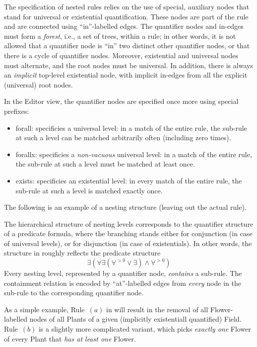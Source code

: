 The specification of nested rules relies on the use of special, auxiliary nodes
that stand for universal or existential quantification. These nodes are part of
the rule and are connected using ``\textsf{in}''-labelled edges. The quantifier
nodes and \textsf{in}-edges must form a \emph{forest}, i.e., a set of trees,
within a rule; in other words, it is not allowed that a quantifier node is
``\textsf{in}'' two distinct other quantifier nodes, or that there is a cycle
of quantifier nodes. Moreover, existential and universal nodes must alternate,
and the root nodes must be universal. In addition, there is always an
\emph{implicit} top-level existential node, with implicit \textsf{in}-edges
from all the explicit (universal) root nodes.

In the Editor view, the quantifier nodes are specified once more using special
prefixes:
\begin{itemize}\noitemsep
\item \textsf{forall:} specificies a universal level: in a match of the entire
  rule, the sub-rule at such a level can be matched arbitrarily often
  (including zero times).
\item \textsf{forallx:} specificies a \emph{non-vacuous} universal level: in a
  match of the entire rule, the sub-rule at such a level must be matched at
  least once.
\item \textsf{exists:} specificies an existential level: in every match of the
  entire rule, the sub-rule at such a level is matched exactly once.
\end{itemize}

The following is an example of a nesting structure (leaving out the actual
rule). 

%
The hierarchical structure of nesting levels corresponds to the
quantifier structure of a predicate formula, where the branching stands either
for conjunction (in case of universal levels), or for disjunction (in case of
existentials). In other words, the structure in  roughly reflects
the predicate structure
%
\[ \exists (\forall \exists (\forall^{>0} \vee \exists) \wedge \forall^{>0}) \]
%
Every nesting level, represented by a quantifier node, \emph{contains} a
sub-rule. The containment relation is encoded by ``\textsf{at}''-labelled edges
from \emph{every} node in the sub-rule to the corresponding quantifier node.

As a simple example, Rule~$(a)$ in  will result in the
removal of all \textsf{Flower}-labelled nodes of all \textsf{Plant}s of a given
(implicitly existentiall quantified) \textsf{Field}.  Rule~$(b)$ is a slightly
more complicated variant, which picks \emph{exactly one} \textsf{Flower} of
every \textsf{Plant} that \emph{has at least one} \textsf{Flower}.

